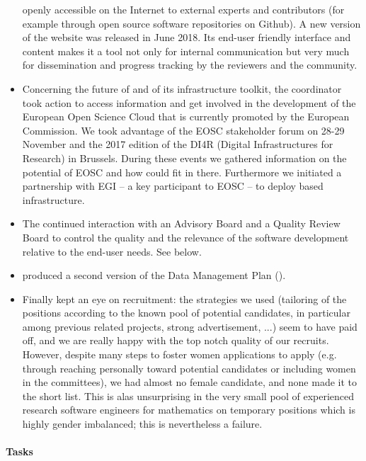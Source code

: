 \begin{itemize}
  openly accessible on the Internet to external experts and
  contributors (for example through open source software repositories
  on Github). A new version of the website was released in June 2018.
  Its end-user friendly interface and content makes it a tool not only
  for internal communication but very much for dissemination and
  progress tracking by the reviewers and the community.
\item Concerning the future of \ODK and of its infrastructure toolkit,
  the coordinator took action to access information and get involved
  in the development of the European Open Science Cloud that is
  currently promoted by the European Commission. We took advantage of
  the EOSC stakeholder forum on 28-29 November and the 2017 edition of
  the DI4R (Digital Infrastructures for Research) in Brussels. During
  these events we gathered information on the potential of EOSC and
  how \ODK could fit in there. Furthermore we initiated a partnership
  with EGI -- a key participant to EOSC -- to deploy \ODK based
  infrastructure.
\item The continued interaction with an Advisory Board and a Quality
  Review Board to control the quality and the relevance of the
  software development relative to the end-user needs. See below.
\item {} produced a second version of the Data Management Plan
  (). 
\item Finally  kept an eye on recruitment: the strategies we
  used (tailoring of the positions according to the known pool of
  potential candidates, in particular among previous related projects,
  strong advertisement, ...) seem to have paid off, and we are really
  happy with the top notch quality of our recruits. However, despite
  many steps to foster women applications to apply (e.g. through
  reaching personally toward potential candidates or including women
  in the committees), we had almost no female candidate, and none made
  it to the short list. This is alas unsurprising in the very small
  pool of experienced research software engineers for mathematics
  on temporary positions which is highly gender imbalanced; this is
  nevertheless a failure.
\end{itemize}


\paragraph{Tasks}

